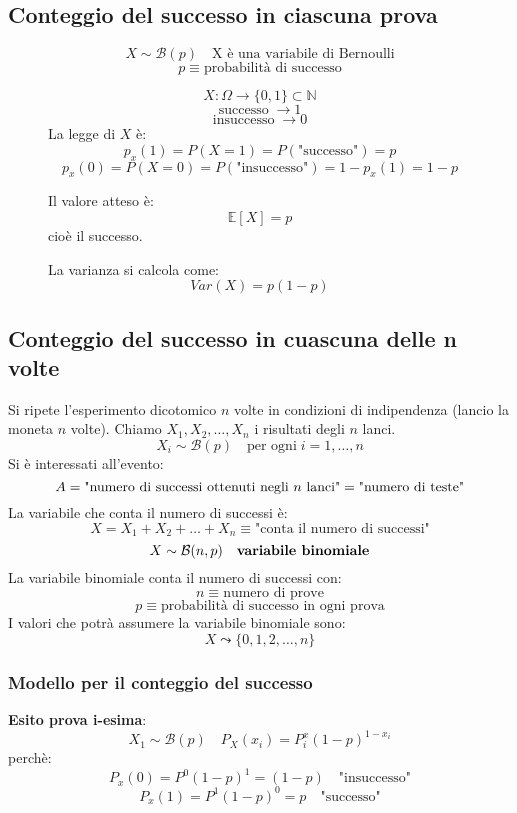 \documentclass[a4paper]{article}
\theoremstyle{break}
\theoremstyle{break}
\theoremstyle{break}
\theoremstyle{break}
\begin{document}
\subsection{Conteggio del successo in ciascuna prova}
\begin{figure}[H]
  \begin{definition}
    \[
      X \sim \mathcal{B}(p) \quad \text{X è una variabile di Bernoulli}
    \] 
    \[
    p \equiv \text{probabilità di successo}
    \] 

    \[ X: \Omega \to \{0,1\} \subset \mathbb{N}  \]
    \[
    \text{successo} \; \to 1
    \] 
    \[
    \text{insuccesso} \; \to 0
    \] 
    La legge di \( X \) è:
    \[
    p_x(1) = P(X=1) = P(\text{"successo"}) = p
    \] 
    \[
    p_x(0) = P(X=0) = P(\text{"insuccesso"}) = 1-p_x(1) = 1-p
    \] 

    \vspace{1em}
    \noindent Il valore atteso è:
    \[
      \mathbb{E}[X] = p
    \] 
    cioè il successo.

    \vspace{1em}
    \noindent La varianza si calcola come:
    \[
      Var(X) = p(1-p)
    \] 
  \end{definition}
\end{figure}

\subsection{Conteggio del successo in cuascuna delle n volte }
Si ripete l'esperimento dicotomico \( n \) volte in condizioni di indipendenza (lancio
la moneta \( n \)  volte). Chiamo \( X_1, X_2, \ldots, X_n \) i risultati degli \( n \)
lanci.
\[
X_i \sim \mathcal{B}(p) \quad \text{per ogni} \; i = 1, \ldots, n
\] 
Si è interessati all'evento:
\[
A = \text{"numero di successi ottenuti negli \( n \) lanci"} = \text{"numero di teste"}
\] 
La variabile che conta il numero di successi è:
\[
X = X_1 + X_2 + \ldots + X_n \equiv \text{"conta il numero di successi"}
\] 
\[
  X \sim \mathcal{B}(n,p) \quad \text{\textbf{variabile binomiale}}
\] 
La variabile binomiale conta il numero di successi con:
\[
n \equiv \text{numero di prove}
\] 
\[
p \equiv \text{probabilità di successo in ogni prova}
\] 
I valori che potrà assumere la variabile binomiale sono:
\[
X \leadsto \{0,1,2, \ldots, n\}
\] 

\subsubsection{Modello per il conteggio del successo}
\textbf{Esito prova i-esima}:
\[
X_1 \sim \mathcal{B}(p) \quad P_X(x_i) = P^x_i(1-p)^{1-x_i}
\] 
perchè:
\[
P_x(0) = P^0(1-p)^1 = (1-p) \quad \text{"insuccesso"}
\] 
\[
P_x(1) = P^1(1-p)^0 = p \quad \text{"successo"}
\] 
\end{document}
